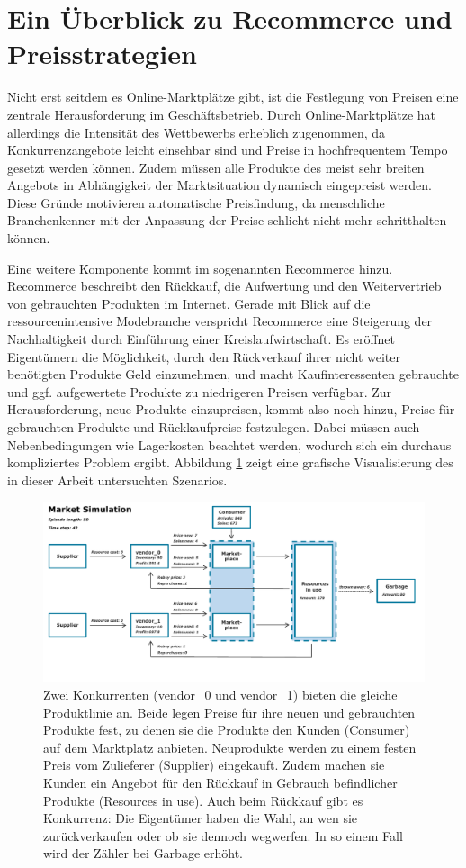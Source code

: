 \section{Ein Überblick zu Recommerce und Preisstrategien}
Nicht erst seitdem es Online-Marktplätze gibt, ist die Festlegung von Preisen eine zentrale Herausforderung im Geschäftsbetrieb.
Durch Online-Marktplätze hat allerdings die Intensität des Wettbewerbs erheblich zugenommen, da Konkurrenzangebote leicht einsehbar sind und Preise in hochfrequentem Tempo gesetzt werden können.
Zudem müssen alle Produkte des meist sehr breiten Angebots in Abhängigkeit der Marktsituation dynamisch eingepreist werden.
Diese Gründe motivieren automatische Preisfindung, da menschliche Branchenkenner mit der Anpassung der Preise schlicht nicht mehr schritthalten können.

Eine weitere Komponente kommt im sogenannten Recommerce hinzu.
Recommerce beschreibt den Rückkauf, die Aufwertung und den Weitervertrieb von gebrauchten Produkten im Internet. %
Gerade mit Blick auf die ressourcenintensive Modebranche verspricht Recommerce eine Steigerung der Nachhaltigkeit durch Einführung einer Kreislaufwirtschaft.
Es eröffnet Eigentümern die Möglichkeit, durch den Rückverkauf ihrer nicht weiter benötigten Produkte Geld einzunehmen, und macht Kaufinteressenten gebrauchte und ggf. aufgewertete Produkte zu niedrigeren Preisen verfügbar.
Zur Herausforderung, neue Produkte einzupreisen, kommt also noch hinzu, Preise für gebrauchten Produkte und Rückkaufpreise festzulegen.
Dabei müssen auch Nebenbedingungen wie Lagerkosten beachtet werden, wodurch sich ein durchaus kompliziertes Problem ergibt.
Abbildung \ref{graphic:MarketOverview} zeigt eine grafische Visualisierung des in dieser Arbeit untersuchten Szenarios.

\begin{figure}[htb]
	\centering
	\includegraphics[width=\textwidth]{introduction/MarketOverview_042.pdf}
	\caption{
		Zwei Konkurrenten (vendor_0 und vendor_1) bieten die gleiche Produktlinie an.
		Beide legen Preise für ihre neuen und gebrauchten Produkte fest,
        zu denen sie die Produkte den Kunden (Consumer) auf dem Marktplatz anbieten.
        Neuprodukte werden zu einem festen Preis vom Zulieferer (Supplier) eingekauft.
		Zudem machen sie Kunden ein Angebot für den Rückkauf in Gebrauch befindlicher Produkte (Resources in use).
		Auch beim Rückkauf gibt es Konkurrenz: Die Eigentümer haben die Wahl, an wen sie zurückverkaufen oder ob sie dennoch wegwerfen.
        In so einem Fall wird der Zähler bei Garbage erhöht.
	}
	\label{graphic:MarketOverview}
\end{figure}

